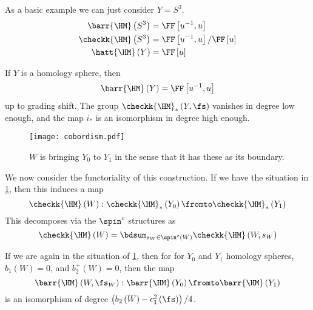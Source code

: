 \documentclass{amsart}
\begin{document}
\begin{exm}
As a basic example we can just consider $Y = S^3$. 
\begin{align}
\barr{\HM}\left( S^3 \right) &= \FF\left[ u^{-1} , u \right]\\
\checkk{\HM}\left( S^3 \right) &= \FF\left[ u^{-1} , u\right] / \FF\left[ u \right]\\
\hatt{\HM}\left( Y \right) &= \FF\left[ u \right]
\end{align}
\end{exm}

\begin{exm}
If $Y$ is a homology sphere, then 
\begin{equation}
\barr{\HM}\left( Y \right) = \FF\left[ u^{-1} , u \right]
\end{equation}
up to grading shift. 
The group $\checkk{\HM}_*\left( Y , \fs \right)$ vanishes in degree low enough, 
and the map $i_*$ is an isomorphism in degree high enough.
\end{exm}

\begin{figure}
\texttt{[image: cobordism.pdf]}
\caption{$W$ is bringing $Y_0$ to $Y_1$ in the sense that it has these
as its boundary.}
\label{fig:Y0_W_Y1}
\end{figure}

We now consider the functoriality of this construction.
If we have the situation in \cref{fig:Y0_W_Y1}, 
then this induces a map
\begin{equation}
\checkk{\HM}\left( W \right) : \checkk{\HM}_*\left( Y_0 \right) \fromto
\checkk{\HM}_*\left( Y_1 \right)
\end{equation}
This decomposes via the $\spin^c$ structures as
\begin{equation}
\checkk{\HM}\left( W \right) =
\bdsum_{s_W \in \spin^c\left( W \right)}
\checkk{\HM}\left( W , s_W \right)
\end{equation}

\begin{fact}
If we are again in the situation of 
\cref{fig:Y0_W_Y1}, then for
for $Y_0$ and $Y_1$ homology spheres, $b_1\left( W \right) = 0$, 
and $b_2^+\left( W \right)= 0$, 
then the map
\begin{equation}
\barr{\HM}\left( W , \fs_W \right): \barr{\HM}\left( Y_0 \right) 
\fromto \barr{\HM}\left( Y_1 \right)
\end{equation}
is an isomorphism of degree $\left( b_2\left( W \right) - c_1^2\left( \fs \right) \right) / 4$.
\end{fact}
\end{document}
